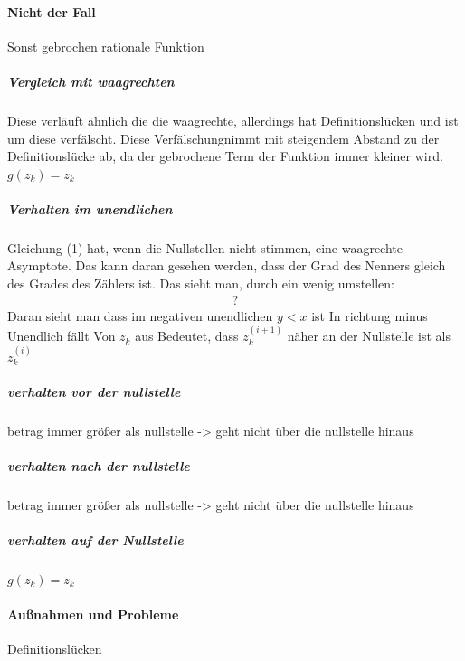\documentclass{article}
\begin{document}
\paragraph{Nicht der Fall}
Sonst gebrochen rationale Funktion
\subparagraph{Vergleich mit waagrechten}
Diese verläuft ähnlich die die waagrechte, allerdings hat Definitionslücken und ist um diese \glqq verfälscht\grqq. Diese \glqq Verfälschung\grqq\space nimmt mit steigendem Abstand zu der Definitionslücke ab, da der gebrochene Term der Funktion immer kleiner wird. 
$g(z_k) = z_k$
\subparagraph{Verhalten im unendlichen}
Gleichung (1) hat, wenn die Nullstellen nicht stimmen, eine waagrechte Asymptote. Das kann daran gesehen werden, dass der Grad des Nenners gleich des Grades des Zählers ist. Das sieht man, durch ein wenig umstellen:
\begin{align*}
    ?
\end{align*}
Daran sieht man dass im negativen unendlichen $y < x$ ist
In richtung minus Unendlich fällt Von $z_k$ aus
Bedeutet, dass $z_k^{(i+1)}$ näher an der Nullstelle ist als $z_k^{(i)}$
\subparagraph{verhalten vor der nullstelle}
betrag immer größer als nullstelle -> geht nicht über die nullstelle hinaus
\subparagraph{verhalten nach der nullstelle}
betrag immer größer als nullstelle -> geht nicht über die nullstelle hinaus
\subparagraph{verhalten auf der Nullstelle}
$g(z_k) = z_k$
\paragraph{Außnahmen und Probleme}
Definitionslücken
\end{document}
